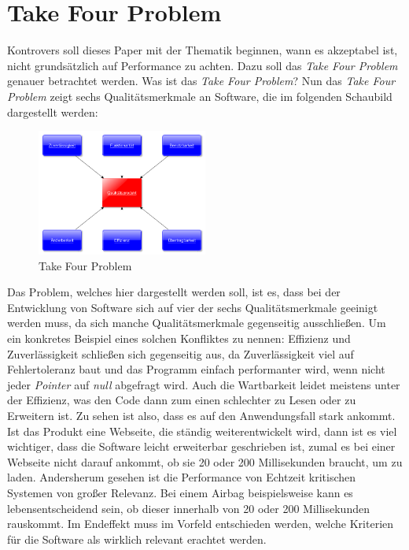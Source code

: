 \section{Take Four Problem}
Kontrovers soll dieses Paper mit der Thematik beginnen, wann es akzeptabel ist, nicht
grundsätzlich auf Performance zu achten. Dazu soll das \emph{Take Four Problem} genauer
betrachtet werden. Was ist das \emph{Take Four Problem}? Nun das \emph{Take Four Problem} zeigt
sechs Qualitätsmerkmale an Software, die im folgenden Schaubild dargestellt werden:

\begin{figure}[h]
    \centering
    \includegraphics[width=0.5\textwidth]{bilder/ISO2}
    \caption[T4P]{Take Four Problem}
    \label{img:T4P}
\end{figure}

Das Problem, welches hier dargestellt werden soll, ist es, dass bei der Entwicklung von Software
sich auf vier der sechs Qualitätsmerkmale geeinigt werden muss, da sich manche Qualitätsmerkmale
gegenseitig ausschließen. Um ein konkretes Beispiel eines solchen Konfliktes zu nennen: Effizienz
und Zuverlässigkeit schließen sich gegenseitig aus, da Zuverlässigkeit viel auf Fehlertoleranz
baut und das Programm einfach performanter wird, wenn nicht jeder \emph{Pointer} auf \emph{null}
abgefragt wird. Auch die Wartbarkeit leidet meistens unter der Effizienz, was den Code dann zum
einen schlechter zu Lesen oder zu Erweitern ist.
\newline
\newline
Zu sehen ist also, dass es auf den Anwendungsfall stark ankommt. Ist das Produkt eine Webseite,
die ständig weiterentwickelt wird, dann ist es viel wichtiger, dass die Software leicht
erweiterbar geschrieben ist, zumal es bei einer Webseite nicht darauf ankommt, ob sie 20 oder 200
Millisekunden braucht, um zu laden.
\newline
\newline
Andersherum gesehen ist die Performance von Echtzeit kritischen Systemen von großer Relevanz. Bei
einem Airbag beispielsweise kann es lebensentscheidend sein, ob dieser innerhalb von 20 oder 200
Millisekunden rauskommt. Im Endeffekt muss im Vorfeld entschieden werden, welche Kriterien für
die Software als wirklich relevant erachtet werden.